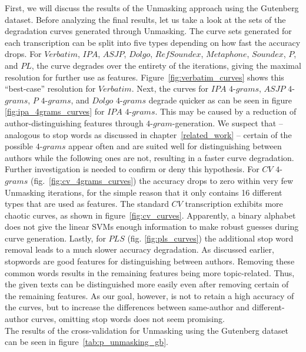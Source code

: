 First, we will discuss the results of the Unmasking approach using the Gutenberg dataset.
Before analyzing the final results, let us take a look at the sets of the degradation curves generated through Unmasking.
The curve sets generated for each transcription can be split into five types depending on how fast the accuracy drops. %
For $Verbatim$, $IPA$, $ASJP$, $Dolgo$, $RefSoundex$, $Metaphone$, $Soundex$, $P$, and $PL$, the curve degrades over the entirety of the iterations, giving the maximal resolution for further use as features.
Figure~\ref{fig:verbatim_curves} shows this ``best-case'' resolution for $Verbatim$.
Next, the curves for $IPA$ $4$-$grams$, $ASJP$ $4$-$grams$, $P$ $4$-$grams$, and $Dolgo$ $4$-$grams$ degrade quicker as can be seen in figure \ref{fig:ipa_4grams_curves} for $IPA$ $4$-$grams$.
This may be caused by a reduction of author-distinguishing features through $4$-$gram$-generation.
We suspect that -- analogous to stop words as discussed in chapter~\ref{related_work} -- certain of the possible $4$-$grams$ appear often and are suited well for distinguishing between authors while the following ones are not, resulting in a faster curve degradation.
Further investigation is needed to confirm or deny this hypothesis.
For $CV$ $4$-$grams$ (fig.~\ref{fig:cv_4grams_curves}) the accuracy drops to zero within very few Unmasking iterations, for the simple reason that it only contains 16 different types that are used as features.
The standard $CV$ transcription exhibits more chaotic curves, as shown in figure~\ref{fig:cv_curves}.
Apparently, a binary alphabet does not give the linear SVMs enough information to make robust guesses during curve generation.
Lastly, for $PLS$ (fig. \ref{fig:pls_curves}) the additional stop word removal leads to a much slower accuracy degradation.
As discussed earlier, stopwords are good features for distinguishing between authors.
Removing these common words results in the remaining features being more topic-related.
Thus, the given texts can be distinguished more easily even after removing certain of the remaining features.
As our goal, however, is not to retain a high accuracy of the curves, but to increase the differences between same-author and different-author curves, omitting stop words does not seem promising.\\
The results of the cross-validation for Unmasking using the Gutenberg dataset can be seen in figure~\ref{tab:p_unmasking_gb}.
